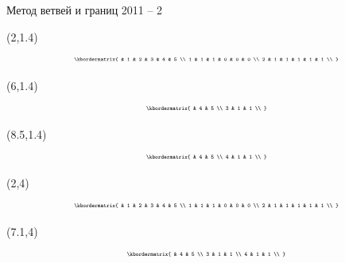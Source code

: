 \documentclass[10pt, dvipsnames]{beamer}
\begin{document}
\begin{frame}{Метод ветвей и границ 2011 -- 2}
	\begin{textblock}{1}(2,1.4)
\[
\tiny
  \kbordermatrix{
	  & 1 & 2 & 3 & 4 & 5 \\
	1 & 1 & 1 & 0 & 0 & 0 \\
    2 & 1 & 1 & 1 & 1 & 1 \\
  }
\]
	\end{textblock}
	
	\begin{textblock}{1}(6,1.4)
\[
\tiny
  \kbordermatrix{
	  & 4 & 5 \\
	3 &	1 & 1 \\
  }
\]
	\end{textblock}
	
	\begin{textblock}{1}(8.5,1.4)
\[
\tiny
  \kbordermatrix{
	  & 4 & 5 \\
	4 &	1 & 1 \\
  }
\]
	\end{textblock}
	
	\begin{textblock}{1}(2,4)
\[
\tiny
  \kbordermatrix{
	  & 1 & 2 & 3 & 4 & 5 \\
	1 & 1 & 1 & 0 & 0 & 0 \\
    2 & 1 & 1 & 1 & 1 & 1 \\
  }
\]
	\end{textblock}
	
	\begin{textblock}{1}(7.1,4)
\[
\tiny
  \kbordermatrix{
      & 4 & 5 \\
	3 & 1 & 1 \\
	4 &	1 & 1 \\
  }
\]
	\end{textblock}

\end{frame}
\end{document}
